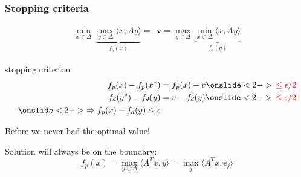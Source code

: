 \documentclass[aspectratio=149]{beamer}
\begin{document}
\begin{frame}
  \frametitle{Stopping criteria}
  \begin{equation}
    \begin{aligned}
      \min_{x \in \Delta} \,\underbrace{\max_{y \in \Delta} \langle x, Ay \rangle}_{f_p(x)} =: \bm{v}  = \max_{y \in \Delta} \, \underbrace{\min_{x \in \Delta} \langle x, Ay \rangle}_{f_d(y)}
    \end{aligned}
  \end{equation}
  \begin{block}{stopping criterion}
    \begin{equation}
      \begin{aligned}
        f_p(x) - f_p(x^*) &= f_p(x) - v \onslide<2->{\textcolor{red}{\, \le \epsilon/2}}\\
        f_d(y^*) - f_d(y) &= v - f_d(y) \onslide<2->{\textcolor{red}{\, \le \epsilon/2}} \\
        \onslide<2->{\Rightarrow f_p(x) - f_d(y) \le \epsilon}
      \end{aligned}
    \end{equation}
  \end{block}
  \begin{center}
    Before we never had the optimal value!
  \end{center}
  Solution will always be on the boundary:
  \begin{equation}
    f_p(x) = \max_{y \in \Delta} \langle A^T x, y \rangle = \max_{j} \langle A^T x, e_j \rangle
  \end{equation}
\end{frame}
\end{document}
